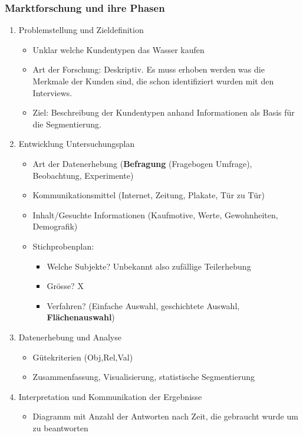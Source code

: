 \documentclass[a4paper]{article}
\begin{document}
\subsubsection{Marktforschung und ihre Phasen}
\begin{enumerate}
    \item Problemstellung und Zieldefinition
    \begin{itemize}
        \item Unklar welche Kundentypen das Wasser kaufen
        \item Art der Forschung: Deskriptiv. Es muss erhoben werden was die Merkmale der Kunden sind, die schon identifiziert wurden mit den Interviews.
        \item Ziel: Beschreibung der Kundentypen anhand Informationen als Basis für die Segmentierung.
    \end{itemize}
    \pagebreak
    \item Entwicklung Untersuchungsplan
    \begin{itemize}
        \item Art der Datenerhebung (\textbf{Befragung} (Fragebogen Umfrage), Beobachtung, Experimente)
        \item Kommunikationsmittel (Internet, Zeitung, Plakate, Tür zu Tür)
        \item Inhalt/Gesuchte Informationen (Kaufmotive, Werte, Gewohnheiten, Demografik)
        \item Stichprobenplan:
        \begin{itemize}
            \item Welche Subjekte? Unbekannt also zufällige Teilerhebung 
            \item Grösse? X
            \item Verfahren? (Einfache Auswahl, geschichtete Auswahl, \textbf{Flächenauswahl})
        \end{itemize}
    \end{itemize}
    \item Datenerhebung und Analyse
    \begin{itemize}
        \item Gütekriterien (Obj,Rel,Val)
        \item Zusammenfassung, Visualisierung, statistische Segmentierung
    \end{itemize}
    \item Interpretation und Kommunikation der Ergebnisse
    \begin{itemize}
        \item Diagramm mit Anzahl der Antworten nach Zeit, die gebraucht wurde um zu beantworten

\end{itemize}
\end{enumerate}
\end{document}
